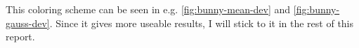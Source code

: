 \documentclass[a4paper,10pt,notitlepage]{scrreprt}
\begin{document}
This coloring scheme can be seen in e.g. \ref{fig:bunny-mean-dev} and
\ref{fig:bunny-gauss-dev}. Since it gives more useable results, I will
stick to it in the rest of this report.

\begin{figure}
\end{figure}
\end{document}
